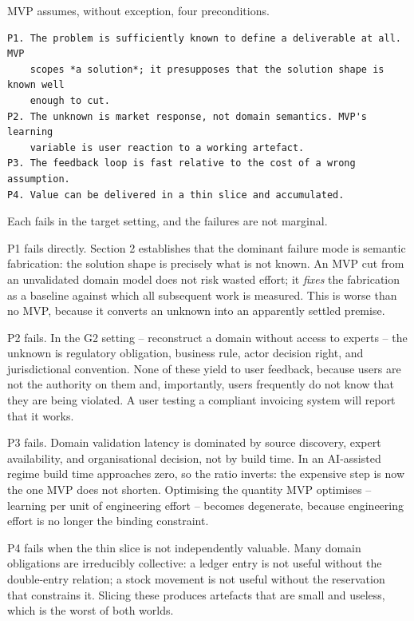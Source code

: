\documentclass[11pt,a4paper]{article}
\begin{document}
MVP assumes, without exception, four preconditions.

\begin{Verbatim}[fontsize=\footnotesize,breaklines=true,breakanywhere=true,breakautoindent=false,samepage=false]
P1. The problem is sufficiently known to define a deliverable at all. MVP
    scopes *a solution*; it presupposes that the solution shape is known well
    enough to cut.
P2. The unknown is market response, not domain semantics. MVP's learning
    variable is user reaction to a working artefact.
P3. The feedback loop is fast relative to the cost of a wrong assumption.
P4. Value can be delivered in a thin slice and accumulated.
\end{Verbatim}

Each fails in the target setting, and the failures are not marginal.

P1 fails directly. Section 2 establishes that the dominant failure mode is semantic fabrication: the solution shape is precisely what is not known. An MVP cut from an unvalidated domain model does not risk wasted effort; it \emph{fixes} the fabrication as a baseline against which all subsequent work is measured. This is worse than no MVP, because it converts an unknown into an apparently settled premise.

P2 fails. In the G2 setting -- reconstruct a domain without access to experts -- the unknown is regulatory obligation, business rule, actor decision right, and jurisdictional convention. None of these yield to user feedback, because users are not the authority on them and, importantly, users frequently do not know that they are being violated. A user testing a compliant invoicing system will report that it works.

P3 fails. Domain validation latency is dominated by source discovery, expert availability, and organisational decision, not by build time. In an AI-assisted regime build time approaches zero, so the ratio inverts: the expensive step is now the one MVP does not shorten. Optimising the quantity MVP optimises -- learning per unit of engineering effort -- becomes degenerate, because engineering effort is no longer the binding constraint.

P4 fails when the thin slice is not independently valuable. Many domain obligations are irreducibly collective: a ledger entry is not useful without the double-entry relation; a stock movement is not useful without the reservation that constrains it. Slicing these produces artefacts that are small and useless, which is the worst of both worlds.
\end{document}

